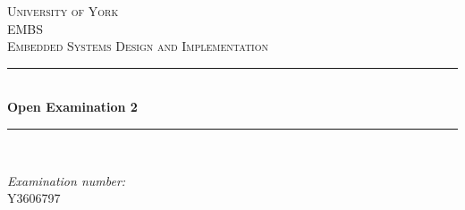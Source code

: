 \documentclass[12pt]{article} %
\begin{document}

\begin{titlepage}

\newcommand{\HRule}{\rule{\linewidth}{0.5mm}} %

\center %

\textsc{\LARGE University of York}\\[1.5cm] %
\textsc{\Large EMBS}\\[0.5cm] %
\textsc{\large Embedded Systems Design and Implementation}\\[0.5cm] %

\HRule \\[0.4cm]
{ \huge \bfseries Open Examination 2}\\[0.4cm] %
\HRule \\[1.5cm]

\begin{minipage}{0.4\textwidth}
\begin{flushleft} \large
\center \emph{Examination number:}\\
\center Y3606797
\end{flushleft}
\end{minipage}


\vfill %

\end{titlepage}


\tableofcontents %

\newpage %

\end{document}
